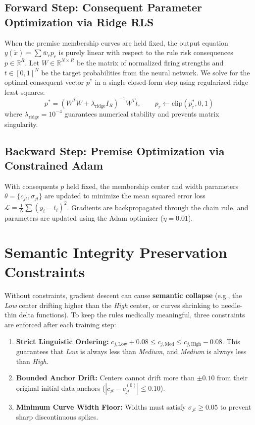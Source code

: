 \documentclass{report}
\begin{document}
\subsection{Forward Step: Consequent Parameter Optimization via Ridge RLS}
When the premise membership curves are held fixed, the output equation $y(\tilde{x}) = \sum \bar{w}_r p_r$ is purely linear with respect to the rule risk consequences $p \in \mathbb{R}^R$. Let $W \in \mathbb{R}^{N \times R}$ be the matrix of normalized firing strengths and $t \in [0, 1]^N$ be the target probabilities from the neural network. We solve for the optimal consequent vector $p^*$ in a single closed-form step using regularized ridge least squares:
\begin{equation}
    p^* = \left( W^T W + \lambda_{\text{ridge}} I_R \right)^{-1} W^T t, \qquad p_r \leftarrow \text{clip}(p_r^*, 0, 1)
\end{equation}
where $\lambda_{\text{ridge}} = 10^{-4}$ guarantees numerical stability and prevents matrix singularity.

\subsection{Backward Step: Premise Optimization via Constrained Adam}
With consequents $p$ held fixed, the membership center and width parameters $\theta = \{c_{jt}, \sigma_{jt}\}$ are updated to minimize the mean squared error loss $\mathcal{L} = \frac{1}{N} \sum (y_i - t_i)^2$. Gradients are backpropagated through the chain rule, and parameters are updated using the Adam optimizer ($\eta = 0.01$).

\section{Semantic Integrity Preservation Constraints}

Without constraints, gradient descent can cause \textbf{semantic collapse} (e.g., the \textit{Low} center drifting higher than the \textit{High} center, or curves shrinking to needle-thin delta functions). To keep the rules medically meaningful, three constraints are enforced after each training step:
\begin{enumerate}
    \setlength{\itemsep}{0pt}
    \setlength{\parskip}{0pt}
    \item \textbf{Strict Linguistic Ordering:} $c_{j, \text{Low}} + 0.08 \le c_{j, \text{Med}} \le c_{j, \text{High}} - 0.08$. This guarantees that \textit{Low} is always less than \textit{Medium}, and \textit{Medium} is always less than \textit{High}.
    \item \textbf{Bounded Anchor Drift:} Centers cannot drift more than $\pm 0.10$ from their original initial data anchors ($|c_{jt} - c_{jt}^{(0)}| \le 0.10$).
    \item \textbf{Minimum Curve Width Floor:} Widths must satisfy $\sigma_{jt} \ge 0.05$ to prevent sharp discontinuous spikes.
\end{enumerate}
\end{document}
